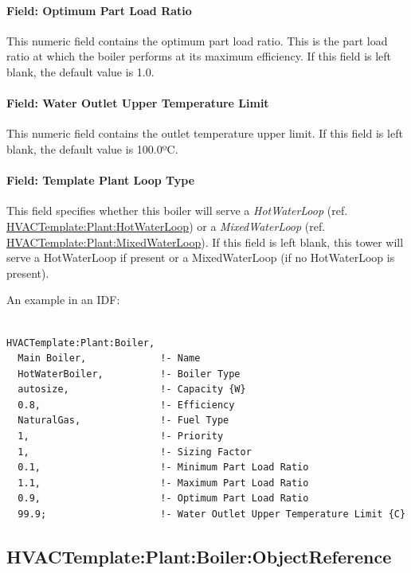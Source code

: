 \paragraph{Field: Optimum Part Load Ratio}\label{field-optimum-part-load-ratio-1-000}

This numeric field contains the optimum part load ratio. This is the part load ratio at which the boiler performs at its maximum efficiency. If this field is left blank, the default value is 1.0.

\paragraph{Field: Water Outlet Upper Temperature Limit}\label{field-water-outlet-upper-temperature-limit}

This numeric field contains the outlet temperature upper limit. If this field is left blank, the default value is 100.0ºC.

\paragraph{Field: Template Plant Loop Type}\label{field-template-plant-loop-type-2}

This field specifies whether this boiler will serve a \emph{HotWaterLoop} (ref. \hyperref[hvactemplateplanthotwaterloop]{HVACTemplate:Plant:HotWaterLoop}) or a \emph{MixedWaterLoop} (ref. \hyperref[hvactemplateplantmixedwaterloop]{HVACTemplate:Plant:MixedWaterLoop}). If this field is left blank, this tower will serve a HotWaterLoop if present or a MixedWaterLoop (if no HotWaterLoop is present).

An example in an IDF:

\begin{lstlisting}

HVACTemplate:Plant:Boiler,
  Main Boiler,             !- Name
  HotWaterBoiler,          !- Boiler Type
  autosize,                !- Capacity {W}
  0.8,                     !- Efficiency
  NaturalGas,              !- Fuel Type
  1,                       !- Priority
  1,                       !- Sizing Factor
  0.1,                     !- Minimum Part Load Ratio
  1.1,                     !- Maximum Part Load Ratio
  0.9,                     !- Optimum Part Load Ratio
  99.9;                    !- Water Outlet Upper Temperature Limit {C}
\end{lstlisting}

\subsection{HVACTemplate:Plant:Boiler:ObjectReference}\label{hvactemplateplantboilerobjectreference}

